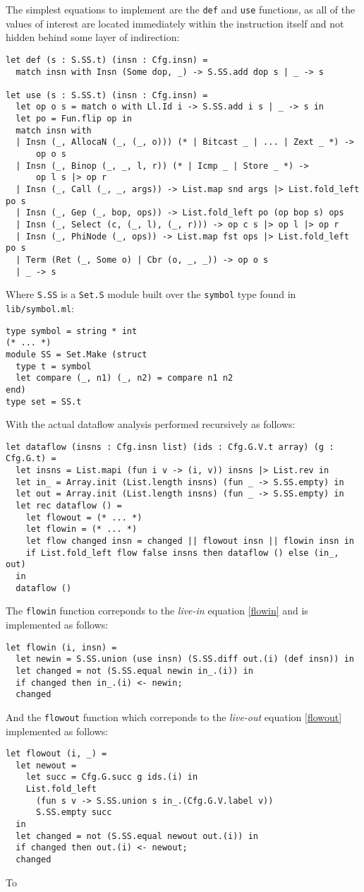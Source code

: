 \documentclass{article}
\begin{document}
The simplest equations to implement are the \lstinline!def! and \lstinline!use! functions, as all of the values of interest are located immediately within the instruction itself and not hidden behind some layer of indirection:
\begin{verbatim}
let def (s : S.SS.t) (insn : Cfg.insn) =
  match insn with Insn (Some dop, _) -> S.SS.add dop s | _ -> s

let use (s : S.SS.t) (insn : Cfg.insn) =
  let op o s = match o with Ll.Id i -> S.SS.add i s | _ -> s in
  let po = Fun.flip op in
  match insn with
  | Insn (_, AllocaN (_, (_, o))) (* | Bitcast _ | ... | Zext _ *) ->
      op o s
  | Insn (_, Binop (_, _, l, r)) (* | Icmp _ | Store _ *) ->
      op l s |> op r
  | Insn (_, Call (_, _, args)) -> List.map snd args |> List.fold_left po s
  | Insn (_, Gep (_, bop, ops)) -> List.fold_left po (op bop s) ops
  | Insn (_, Select (c, (_, l), (_, r))) -> op c s |> op l |> op r
  | Insn (_, PhiNode (_, ops)) -> List.map fst ops |> List.fold_left po s
  | Term (Ret (_, Some o) | Cbr (o, _, _)) -> op o s
  | _ -> s
\end{verbatim}
Where \lstinline!S.SS! is a \lstinline!Set.S! module built over the \lstinline!symbol! type found in \lstinline!lib/symbol.ml!:
\begin{verbatim}
type symbol = string * int
(* ... *)
module SS = Set.Make (struct
  type t = symbol
  let compare (_, n1) (_, n2) = compare n1 n2
end)
type set = SS.t
\end{verbatim}
With the actual dataflow analysis performed recursively as follows:
\begin{verbatim}
let dataflow (insns : Cfg.insn list) (ids : Cfg.G.V.t array) (g : Cfg.G.t) =
  let insns = List.mapi (fun i v -> (i, v)) insns |> List.rev in
  let in_ = Array.init (List.length insns) (fun _ -> S.SS.empty) in
  let out = Array.init (List.length insns) (fun _ -> S.SS.empty) in
  let rec dataflow () =
    let flowout = (* ... *)
    let flowin = (* ... *)
    let flow changed insn = changed || flowout insn || flowin insn in
    if List.fold_left flow false insns then dataflow () else (in_, out)
  in
  dataflow ()
\end{verbatim}
The \texttt{flowin} function correponds to the \textit{live-in} equation \eqref{flowin} and is implemented as follows:
\begin{verbatim}
let flowin (i, insn) =
  let newin = S.SS.union (use insn) (S.SS.diff out.(i) (def insn)) in
  let changed = not (S.SS.equal newin in_.(i)) in
  if changed then in_.(i) <- newin;
  changed
\end{verbatim}
And the \texttt{flowout} function which correponds to the \textit{live-out} equation \eqref{flowout} implemented as follows:
\begin{verbatim}
let flowout (i, _) =
  let newout =
    let succ = Cfg.G.succ g ids.(i) in
    List.fold_left
      (fun s v -> S.SS.union s in_.(Cfg.G.V.label v))
      S.SS.empty succ
  in
  let changed = not (S.SS.equal newout out.(i)) in
  if changed then out.(i) <- newout;
  changed
\end{verbatim}
To 
\end{document}
